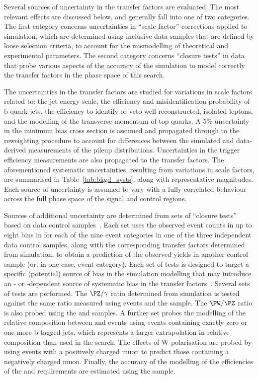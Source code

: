 Several sources of uncertainty in the transfer factors are evaluated.
The most relevant effects are discussed below, and generally fall into
one of two categories. The first category concerns uncertainties in
``scale factor'' corrections applied to simulation, which are
determined using inclusive data samples that are defined by loose
selection criteria, to account for the mismodelling of theoretical and
experimental parameters. The second category concerns ``closure
tests'' in data that probe various aspects of the accuracy of the
simulation to model correctly the transfer factors in the phase space
of this search.

The uncertainties in the transfer factors are studied for variations
in scale factors related to: the jet energy scale, the efficiency and
misidentification probability of b quark jets, the efficiency to
identify or veto well-reconstructed, isolated leptons, and the
modelling of the transverse momentum of top quarks. %
A 5\% uncertainty in the minimum bias cross section is assumed and
propagated through to the reweighting procedure to account for
differences between the simulated and data-derived measurements of the
pileup distributions.  Uncertainties in the trigger efficiency
measurements are also propagated to the transfer factors.  The
aforementioned systematic uncertainties, resulting from variations in
scale factors, are summarised in Table~\ref{tab:bkgd_systs}, along
with representative magnitudes.  Each source of uncertainty is assumed
to vary with a fully correlated behaviour across the full phase space
of the signal and control regions.

Sources of additional uncertainty are determined from sets of
``closure tests'' based on data control
samples~\cite{RA1Paper2012}. Each set uses the observed event counts
in up to eight bins in \scalht for each of the nine \njet event
categories in one of the three independent data control samples, along
with the corresponding transfer factors determined from simulation, to
obtain a prediction of the observed yields in another control sample
(or, in one case, \nb event category). 
Each set of tests is designed to target a specific (potential) source
of bias in the simulation modelling that may introduce an \njet- or
\scalht-dependent source of systematic bias in the transfer
factors~\cite{RA1Paper2012}. Several sets of tests are performed. The
$\PZ/\gamma$ ratio determined from simulation is tested against the
same ratio measured using \zmmj events and the \gj sample. The
$\PW/\PZ$ ratio is also probed using the \mj and \mmj samples. A
further set probes the modelling of the relative composition between
\wlj and \ttbar events using \mj events containing exactly zero or one
more b-tagged jets, which represents a larger extrapolation in
relative composition than used in the search.  The effects of W
polarisation are probed by using \mj events with a positively charged
muon to predict those containing a negatively charged muon. Finally,
the accuracy of the modelling of the efficiencies of the \alphat and
\bdphi requirements are estimated using the \mj sample.

